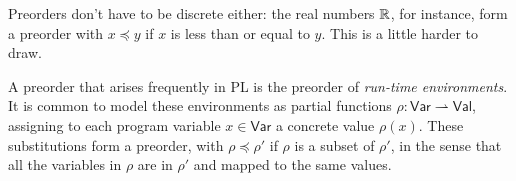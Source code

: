 Preorders don't have to be discrete either: the real numbers \(\mathbb R\),
for instance, form a preorder with \(x \preceq y\) if \(x\) is less than or equal to \(y\). This is a little harder to draw.

A preorder that arises frequently in PL is the preorder of
\emph{run-time environments}.
It is common to model these environments
as partial functions \(\rho : \mathsf{Var} \rightharpoonup \mathsf{Val}\),
assigning to each program variable \(x \in \mathsf{Var}\)
a concrete value \(\rho(x)\).
These substitutions form a preorder, with \(\rho \preceq \rho'\)
if \(\rho\) is a subset of \(\rho'\), in the sense that all the 
variables in $\rho$ are in $\rho'$ and mapped to the same values.


